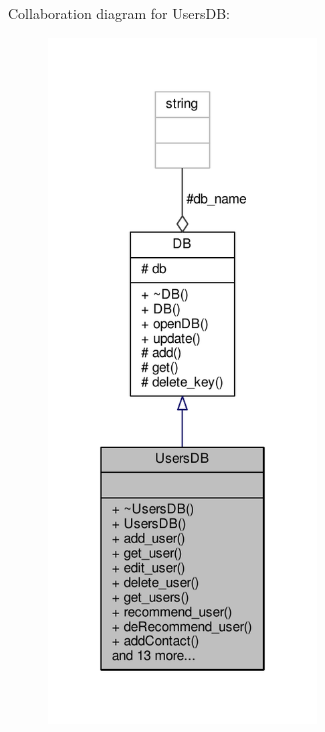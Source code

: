 Collaboration diagram for Users\+DB\+:\nopagebreak
\begin{figure}[H]
\begin{center}
\leavevmode
\includegraphics[width=202pt]{d9/d9e/classUsersDB__coll__graph}
\end{center}
\end{figure}
